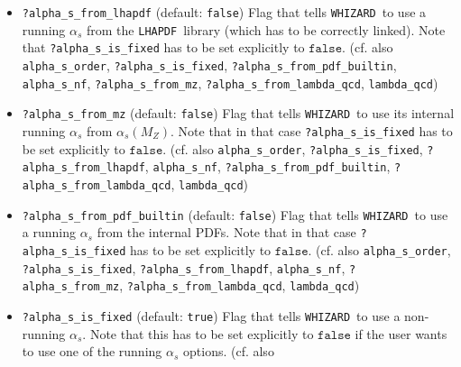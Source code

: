 \documentclass[12pt]{book}
\newcommand{\ttt}[1]{\texttt{#1}}
\newcommand{\whizard}{\texttt{WHIZARD}}
\newcommand{\lhapdf}{\texttt{LHAPDF}}
\begin{document}
\begin{itemize}
\ttt{?alpha\_s\_from\_lambda\_qcd} \qquad (default: \ttt{false})
\newline 
Flag that tells \whizard\ to use its internal running $\alpha_s$ from
$\alpha_s(\Lambda_{QCD})$. Note that in that case
\ttt{?alpha\_s\_is\_fixed} has  to be set explicitly to
$\ttt{false}$. (cf. also \ttt{alpha\_s\_order},
\ttt{?alpha\_s\_is\_fixed}, \ttt{?alpha\_s\_from\_lhapdf},
\ttt{alpha\_s\_nf}, \ttt{?alpha\_s\_from\_pdf\_builtin}, \newline 
\ttt{?alpha\_s\_from\_mz}, 
\ttt{lambda\_qcd})   
\item
\ttt{?alpha\_s\_from\_lhapdf} \qquad (default: \ttt{false}) \newline
Flag that tells \whizard\ to use a running $\alpha_s$ from the
\lhapdf\ library (which has to be correctly linked). Note that
\ttt{?alpha\_s\_is\_fixed} has to be set explicitly to
$\ttt{false}$. (cf. also
\ttt{alpha\_s\_order}, \ttt{?alpha\_s\_is\_fixed},
\ttt{?alpha\_s\_from\_pdf\_builtin}, \ttt{alpha\_s\_nf},
\ttt{?alpha\_s\_from\_mz}, \ttt{?alpha\_s\_from\_lambda\_qcd},
\ttt{lambda\_qcd})   
\item
\ttt{?alpha\_s\_from\_mz} \qquad (default: \ttt{false})
\newline 
Flag that tells \whizard\ to use its internal running $\alpha_s$ from
$\alpha_s(M_Z)$. Note that in that case \ttt{?alpha\_s\_is\_fixed} has 
to be set explicitly to $\ttt{false}$. (cf. also
\ttt{alpha\_s\_order}, \ttt{?alpha\_s\_is\_fixed},
\ttt{?alpha\_s\_from\_lhapdf}, \ttt{alpha\_s\_nf},
\ttt{?alpha\_s\_from\_pdf\_builtin}, \newline
\ttt{?alpha\_s\_from\_lambda\_qcd}, 
\ttt{lambda\_qcd})   
\item
\ttt{?alpha\_s\_from\_pdf\_builtin} \qquad (default: \ttt{false})
\newline 
Flag that tells \whizard\ to use a running $\alpha_s$ from the
internal PDFs. Note that in that case \ttt{?alpha\_s\_is\_fixed} has
to be set explicitly to $\ttt{false}$. (cf. also
\ttt{alpha\_s\_order}, \ttt{?alpha\_s\_is\_fixed},
\ttt{?alpha\_s\_from\_lhapdf}, \ttt{alpha\_s\_nf},
\ttt{?alpha\_s\_from\_mz}, \newline \ttt{?alpha\_s\_from\_lambda\_qcd},
\ttt{lambda\_qcd})   
\item
\ttt{?alpha\_s\_is\_fixed} \qquad (default: \ttt{true}) \newline
Flag that tells \whizard\ to use a non-running $\alpha_s$. Note that
this has to be set explicitly to $\ttt{false}$ if the user wants to use
one of the running $\alpha_s$ options. (cf. also

\end{itemize}
\end{document}
